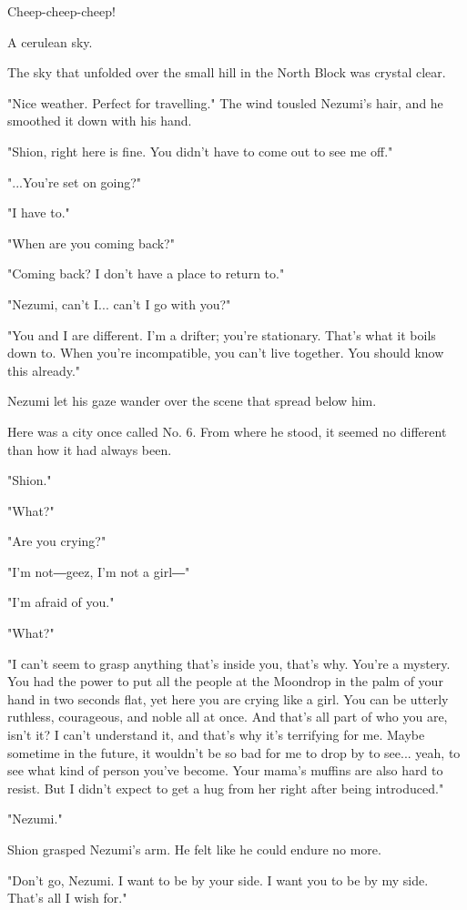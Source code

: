 Cheep-cheep-cheep!

A cerulean sky.

The sky that unfolded over the small hill in the North Block was crystal
clear.

"Nice weather. Perfect for travelling." The wind tousled Nezumi's hair,
and he smoothed it down with his hand.

"Shion, right here is fine. You didn't have to come out to see me off."

"...You're set on going?"

"I have to."

"When are you coming back?"

"Coming back? I don't have a place to return to."

"Nezumi, can't I... can't I go with you?"

"You and I are different. I'm a drifter; you're stationary. That's what
it boils down to. When you're incompatible, you can't live together. You
should know this already."

Nezumi let his gaze wander over the scene that spread below him.

Here was a city once called No. 6. From where he stood, it seemed no
different than how it had always been.

"Shion."

"What?"

"Are you crying?"

"I'm not―geez, I'm not a girl―"

"I'm afraid of you."

"What?"

"I can't seem to grasp anything that's inside you, that's why. You're a
mystery. You had the power to put all the people at the Moondrop in the
palm of your hand in two seconds flat, yet here you are crying like a
girl. You can be utterly ruthless, courageous, and noble all at once.
And that's all part of who you are, isn't it? I can't understand it, and
that's why it's terrifying for me. Maybe sometime in the future, it
wouldn't be so bad for me to drop by to see... yeah, to see what kind of
person you've become. Your mama's muffins are also hard to resist. But I
didn't expect to get a hug from her right after being introduced."

"Nezumi."

Shion grasped Nezumi's arm. He felt like he could endure no more.

"Don't go, Nezumi. I want to be by your side. I want you to be by my
side. That's all I wish for."

